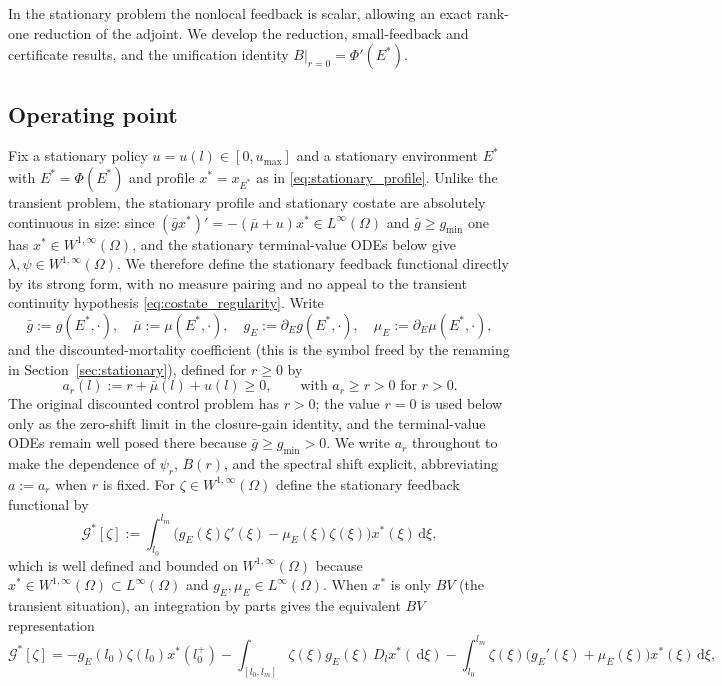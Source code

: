 \documentclass[pdflatex,sn-mathphys-num]{sn-jnl}
\newcommand{\Om}{\Omega}
\newcommand{\dd}{\,\mathrm{d}}
\theoremstyle{plain}
\theoremstyle{definition}
\theoremstyle{remark}
\begin{document}
In the stationary problem the nonlocal feedback is scalar, allowing an exact
rank-one reduction of the adjoint. We develop the reduction, small-feedback and
certificate results, and the unification identity $B|_{r=0}=\Phi'(E^*)$.

\subsection{Operating point}
\label{subsec:stationary_operating_point}

Fix a stationary policy $u=u(l)\in[0,u_{\max}]$ and a stationary environment $E^*$
with $E^*=\Phi(E^*)$ and profile $x^*=x_{E^*}$ as in
\eqref{eq:stationary_profile}. Unlike the transient problem, the stationary
profile and stationary costate are absolutely continuous in size: since
$(\bar g x^*)'=-(\bar\mu+u)x^*\in L^\infty(\Om)$ and $\bar g\ge g_{\min}$ one has
$x^*\in W^{1,\infty}(\Om)$, and the stationary terminal-value ODEs below give
$\lambda,\psi\in W^{1,\infty}(\Om)$. We therefore define the stationary feedback
functional directly by its strong form, with no measure pairing and no
appeal to the transient continuity hypothesis \eqref{eq:costate_regularity}. Write
\[
\bar g:=g(E^*,\cdot),\quad
\bar\mu:=\mu(E^*,\cdot),\quad
g_E:=\partial_Eg(E^*,\cdot),\quad
\mu_E:=\partial_E\mu(E^*,\cdot),
\]
and the discounted-mortality coefficient (this is the symbol freed by the
renaming in Section~\ref{sec:stationary}), defined for $r\ge0$ by
\[
a_r(l):=r+\bar\mu(l)+u(l)\ge0,
\qquad\text{with }a_r\ge r>0\text{ for }r>0.
\]
The original discounted control problem has $r>0$; the value $r=0$ is used below
only as the zero-shift limit in the closure-gain identity, and the terminal-value
ODEs remain well posed there because $\bar g\ge g_{\min}>0$. We write $a_r$
throughout to make the dependence of $\psi_r$, $B(r)$, and the spectral shift
explicit, abbreviating $a:=a_r$ when $r$ is fixed.
For $\zeta\in W^{1,\infty}(\Om)$ define the stationary feedback functional by
\begin{equation}\label{eq:stationary_G_smooth}
\mathcal G^*[\zeta]
:=
\int_{l_0}^{l_m}\big(g_E(\xi)\zeta'(\xi)-\mu_E(\xi)\zeta(\xi)\big)x^*(\xi)\dd\xi,
\end{equation}
which is well defined and bounded on $W^{1,\infty}(\Om)$ because
$x^*\in W^{1,\infty}(\Om)\subset L^\infty(\Om)$ and $g_E,\mu_E\in L^\infty(\Om)$.
When $x^*$ is only $BV$ (the transient situation), an integration by parts gives
the equivalent $BV$ representation
\begin{equation}\label{eq:stationary_G_functional}
\mathcal G^*[\zeta]
=
-g_E(l_0)\zeta(l_0)x^*(l_0^+)
-\int_{[l_0,l_m]}\zeta(\xi)g_E(\xi)\,D_lx^*(\dd\xi)
-\int_{l_0}^{l_m}\zeta(\xi)\big(g_E'(\xi)+\mu_E(\xi)\big)x^*(\xi)\dd\xi,
\end{equation}
\end{document}
